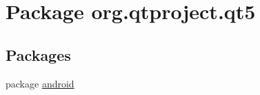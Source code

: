 \hypertarget{namespaceorg_1_1qtproject_1_1qt5}{}\section{Package org.\+qtproject.\+qt5}
\label{namespaceorg_1_1qtproject_1_1qt5}
\subsection*{Packages}
\begin{DoxyCompactItemize}
\item 
package \hyperlink{namespaceorg_1_1qtproject_1_1qt5_1_1android}{android}
\end{DoxyCompactItemize}
